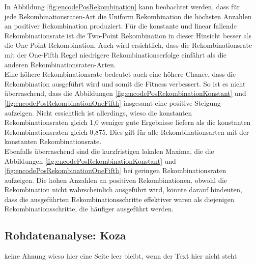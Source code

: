 In Abbildung \ref{fig:encodePosRekombination} kann beobachtet werden, dass für jede Rekombinationsraten-Art die Uniform Rekombination die höchsten Anzahlen an positiver Rekombination produziert.
Für die konstante und linear fallende Rekombinationsrate ist die Two-Point Rekombination in dieser Hinsicht besser als die One-Point Rekombination.
Auch wird ersichtlich, dass die Rekombinationsrate mit der One-Fifth Regel niedrigere Rekombinationserfolge einfährt als die anderen Rekombinationsraten-Arten.\\
Eine höhere Rekombinationsrate bedeutet auch eine höhere Chance, dass die Rekombination ausgeführt wird und somit die Fitness verbessert.
So ist es nicht überraschend, dass die Abbildungen \ref{fig:encodePosRekombinationKonstant} und \ref{fig:encodePosRekombinationOneFifth} insgesamt eine positive Steigung aufzeigen.
Nicht ersichtlich ist allerdings, wieso die konstanten Rekombinationsraten gleich 1,0 weniger gute Ergebnisse liefern als die konstanten Rekombinationsraten gleich 0,875.
Dies gilt für alle Rekombinationsarten mit der konstanten Rekombinationsrate.\\
Ebenfalls überraschend sind die kurzfristigen lokalen Maxima, die die Abbildungen \ref{fig:encodePosRekombinationKonstant} und \ref{fig:encodePosRekombinationOneFifth} bei geringen Rekombinationsraten aufzeigen.
Die hohen Anzahlen an positiven Rekombinationen, obwohl die Rekombination nicht wahrscheinlich ausgeführt wird, könnte darauf hindeuten, dass die ausgeführten Rekombinationsschritte effektiver waren als diejenigen Rekombinationsschritte, die häufiger ausgeführt werden.


\subsection{Rohdatenanalyse: Koza}
\label{subsec:rohdatenKoza}

keine Ahnung wieso hier eine Seite leer bleibt, wenn der Text hier nicht steht

